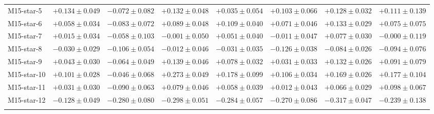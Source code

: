 \begin{table}
\begin{tabular*}{\textheight}{@{\extracolsep\fill}l c c c c c c c@{}}
M15-star-5 & $+0.134 \pm 0.049$ & $-0.072 \pm 0.082$ & $+0.132 \pm 0.048$ & $+0.035 \pm 0.054$ & $+0.103 \pm 0.066$ & $+0.128 \pm 0.032$ & $+0.111 \pm 0.139$ \\ 
M15-star-6 & $+0.058 \pm 0.034$ & $-0.083 \pm 0.072$ & $+0.089 \pm 0.048$ & $+0.109 \pm 0.040$ & $+0.071 \pm 0.046$ & $+0.133 \pm 0.029$ & $+0.075 \pm 0.075$ \\ 
M15-star-7 & $+0.015 \pm 0.034$ & $-0.058 \pm 0.103$ & $-0.001 \pm 0.050$ & $+0.051 \pm 0.040$ & $-0.011 \pm 0.047$ & $+0.077 \pm 0.030$ & $-0.000 \pm 0.119$ \\ 
M15-star-8 & $-0.030 \pm 0.029$ & $-0.106 \pm 0.054$ & $-0.012 \pm 0.046$ & $-0.031 \pm 0.035$ & $-0.126 \pm 0.038$ & $-0.084 \pm 0.026$ & $-0.094 \pm 0.076$ \\ 
M15-star-9 & $+0.043 \pm 0.030$ & $-0.064 \pm 0.049$ & $+0.139 \pm 0.046$ & $+0.078 \pm 0.032$ & $+0.031 \pm 0.033$ & $+0.132 \pm 0.026$ & $+0.091 \pm 0.079$ \\ 
M15-star-10 & $+0.101 \pm 0.028$ & $-0.046 \pm 0.068$ & $+0.273 \pm 0.049$ & $+0.178 \pm 0.099$ & $+0.106 \pm 0.034$ & $+0.169 \pm 0.026$ & $+0.177 \pm 0.104$ \\ 
M15-star-11 & $+0.031 \pm 0.030$ & $-0.090 \pm 0.063$ & $+0.079 \pm 0.046$ & $+0.058 \pm 0.039$ & $+0.012 \pm 0.043$ & $+0.066 \pm 0.029$ & $+0.098 \pm 0.067$ \\ 
M15-star-12 & $-0.128 \pm 0.049$ & $-0.280 \pm 0.080$ & $-0.298 \pm 0.051$ & $-0.284 \pm 0.057$ & $-0.270 \pm 0.086$ & $-0.317 \pm 0.047$ & $-0.239 \pm 0.138$ \\ 
\botrule
\end{tabular*}
\end{table}